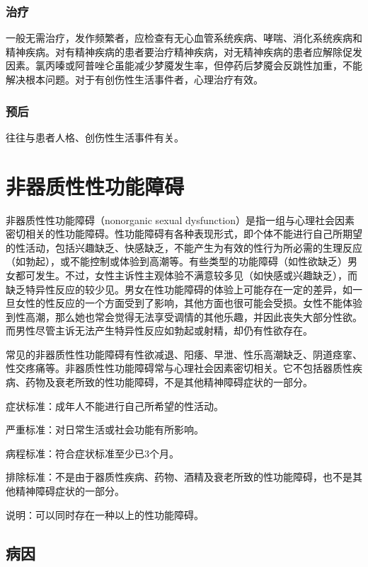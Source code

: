 \subsubsection{治疗}

一般无需治疗，发作频繁者，应检查有无心血管系统疾病、哮喘、消化系统疾病和精神疾病。对有精神疾病的患者要治疗精神疾病，对无精神疾病的患者应解除促发因素。氯丙嗪或阿普唑仑虽能减少梦魇发生率，但停药后梦魇会反跳性加重，不能解决根本问题。对于有创伤性生活事件者，心理治疗有效。

\subsubsection{预后}

往往与患者人格、创伤性生活事件有关。

\section{非器质性性功能障碍}

非器质性性功能障碍（nonorganic sexual
dysfunction）是指一组与心理社会因素密切相关的性功能障碍。性功能障碍有各种表现形式，即个体不能进行自己所期望的性活动，包括兴趣缺乏、快感缺乏，不能产生为有效的性行为所必需的生理反应（如勃起），或不能控制或体验到高潮等。有些类型的功能障碍（如性欲缺乏）男女都可发生。不过，女性主诉性主观体验不满意较多见（如快感或兴趣缺乏），而缺乏特异性反应的较少见。男女在性功能障碍的体验上可能存在一定的差异，如一旦女性的性反应的一个方面受到了影响，其他方面也很可能会受损。女性不能体验到性高潮，那么她也常会觉得无法享受调情的其他乐趣，并因此丧失大部分性欲。而男性尽管主诉无法产生特异性反应如勃起或射精，却仍有性欲存在。

常见的非器质性性功能障碍有性欲减退、阳痿、早泄、性乐高潮缺乏、阴道痉挛、性交疼痛等。非器质性性功能障碍常与心理社会因素密切相关。它不包括器质性疾病、药物及衰老所致的性功能障碍，不是其他精神障碍症状的一部分。

症状标准：成年人不能进行自己所希望的性活动。

严重标准：对日常生活或社会功能有所影响。

病程标准：符合症状标准至少已3个月。

排除标准：不是由于器质性疾病、药物、酒精及衰老所致的性功能障碍，也不是其他精神障碍症状的一部分。

说明：可以同时存在一种以上的性功能障碍。

\subsection{病因}

